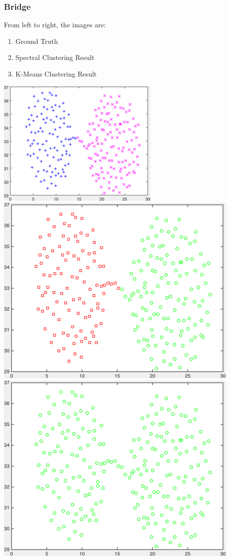\documentclass[11pt]{article}
\begin{document}
\subsubsection*{Bridge} 
From left to right, the images are:
\begin{enumerate}
\item Ground Truth
\item Spectral Clustering Result
\item K-Means Clustering Result
\end{enumerate}
\begin{center}
\includegraphics[scale=0.5]{bridge} \ 
\includegraphics[scale=0.25]{results_spectral_bridge} \ 
\includegraphics[scale=0.25]{results_kmeans_bridge}
\end{center}
\end{document}
